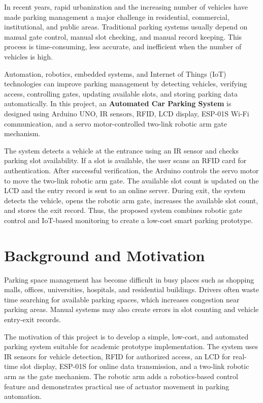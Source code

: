 
In recent years, rapid urbanization and the increasing number of vehicles have made parking management a major challenge in residential, commercial, institutional, and public areas. Traditional parking systems usually depend on manual gate control, manual slot checking, and manual record keeping. This process is time-consuming, less accurate, and inefficient when the number of vehicles is high.

Automation, robotics, embedded systems, and Internet of Things (IoT) technologies can improve parking management by detecting vehicles, verifying access, controlling gates, updating available slots, and storing parking data automatically. In this project, an \textbf{Automated Car Parking System} is designed using Arduino UNO, IR sensors, RFID, LCD display, ESP-01S Wi-Fi communication, and a servo motor-controlled two-link robotic arm gate mechanism.

The system detects a vehicle at the entrance using an IR sensor and checks parking slot availability. If a slot is available, the user scans an RFID card for authentication. After successful verification, the Arduino controls the servo motor to move the two-link robotic arm gate. The available slot count is updated on the LCD and the entry record is sent to an online server. During exit, the system detects the vehicle, opens the robotic arm gate, increases the available slot count, and stores the exit record. Thus, the proposed system combines robotic gate control and IoT-based monitoring to create a low-cost smart parking prototype.

\section{Background and Motivation}

Parking space management has become difficult in busy places such as shopping malls, offices, universities, hospitals, and residential buildings. Drivers often waste time searching for available parking spaces, which increases congestion near parking areas. Manual systems may also create errors in slot counting and vehicle entry-exit records.

The motivation of this project is to develop a simple, low-cost, and automated parking system suitable for academic prototype implementation. The system uses IR sensors for vehicle detection, RFID for authorized access, an LCD for real-time slot display, ESP-01S for online data transmission, and a two-link robotic arm as the gate mechanism. The robotic arm adds a robotics-based control feature and demonstrates practical use of actuator movement in parking automation.

